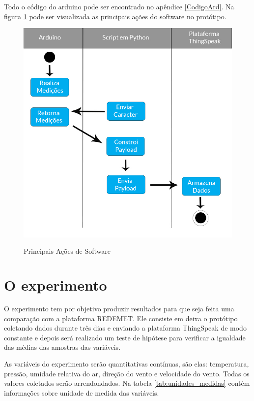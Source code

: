 Todo o código do arduino pode ser encontrado no apêndice \ref{CodigoArd}. Na figura \ref{fig:acoes_software} pode ser visualizada as principais ações do software no protótipo.

\begin{figure} [!h]
    \centering
    \caption{Principais Ações de Software}
    \includegraphics [scale=0.40]{Figuras/fluxo.jpg}
    \label{fig:acoes_software}
\end{figure}

\section{O experimento}

O experimento tem por objetivo produzir resultados para que seja feita uma comparação com a plataforma REDEMET. Ele consiste em deixa o protótipo coletando dados durante três dias e enviando a plataforma ThingSpeak de modo constante e depois será realizado um teste de hipótese para verificar a igualdade das médias das amostras das variáveis.

As variáveis do experimento serão quantitativas contínuas, são elas: temperatura, pressão, umidade relativa do ar, direção do vento e velocidade do vento. Todas os valores coletados serão arrendondados. Na tabela \ref{tab:unidades_medidas} contém informações sobre unidade de medida das variáveis.

